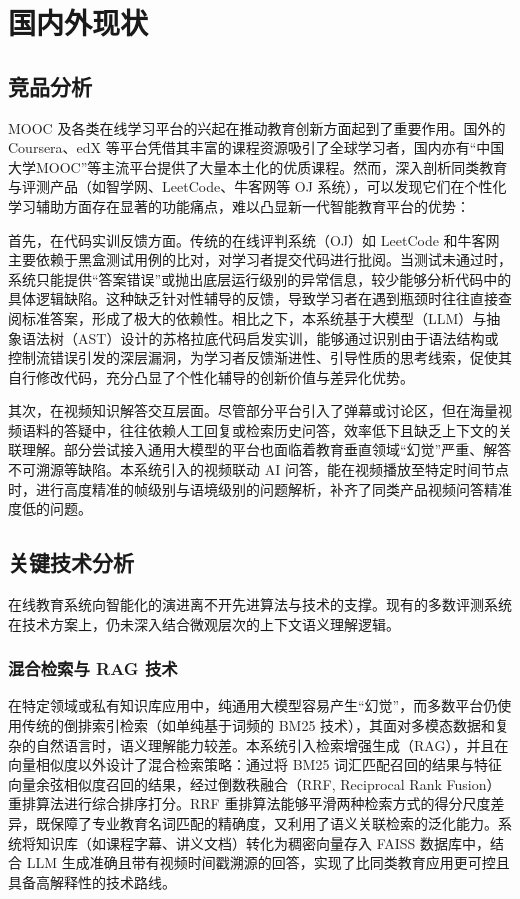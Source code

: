 \chapter{国内外现状}

\section{竞品分析}

MOOC 及各类在线学习平台的兴起在推动教育创新方面起到了重要作用。国外的 Coursera、edX 等平台凭借其丰富的课程资源吸引了全球学习者，国内亦有“中国大学MOOC”等主流平台提供了大量本土化的优质课程。然而，深入剖析同类教育与评测产品（如智学网、LeetCode、牛客网等 OJ 系统），可以发现它们在个性化学习辅助方面存在显著的功能痛点，难以凸显新一代智能教育平台的优势：

首先，在代码实训反馈方面。传统的在线评判系统（OJ）如 LeetCode 和牛客网主要依赖于黑盒测试用例的比对，对学习者提交代码进行批阅。当测试未通过时，系统只能提供“答案错误”或抛出底层运行级别的异常信息，较少能够分析代码中的具体逻辑缺陷。这种缺乏针对性辅导的反馈，导致学习者在遇到瓶颈时往往直接查阅标准答案，形成了极大的依赖性。相比之下，本系统基于大模型（LLM）与抽象语法树（AST）设计的苏格拉底代码启发实训，能够通过识别由于语法结构或控制流错误引发的深层漏洞，为学习者反馈渐进性、引导性质的思考线索，促使其自行修改代码，充分凸显了个性化辅导的创新价值与差异化优势。

其次，在视频知识解答交互层面。尽管部分平台引入了弹幕或讨论区，但在海量视频语料的答疑中，往往依赖人工回复或检索历史问答，效率低下且缺乏上下文的关联理解。部分尝试接入通用大模型的平台也面临着教育垂直领域“幻觉”严重、解答不可溯源等缺陷。本系统引入的视频联动 AI 问答，能在视频播放至特定时间节点时，进行高度精准的帧级别与语境级别的问题解析，补齐了同类产品视频问答精准度低的问题。

\section{关键技术分析}

在线教育系统向智能化的演进离不开先进算法与技术的支撑。现有的多数评测系统在技术方案上，仍未深入结合微观层次的上下文语义理解逻辑。

\subsection{混合检索与 RAG 技术}
在特定领域或私有知识库应用中，纯通用大模型容易产生“幻觉”，而多数平台仍使用传统的倒排索引检索（如单纯基于词频的 BM25 技术\cite{whu-bachelor:14}），其面对多模态数据和复杂的自然语言时，语义理解能力较差。本系统引入检索增强生成（RAG），并且在向量相似度以外设计了混合检索策略：通过将 BM25 词汇匹配召回的结果与特征向量余弦相似度召回的结果，经过倒数秩融合（RRF, Reciprocal Rank Fusion）重排算法进行综合排序打分。RRF 重排算法能够平滑两种检索方式的得分尺度差异，既保障了专业教育名词匹配的精确度，又利用了语义关联检索的泛化能力。系统将知识库（如课程字幕、讲义文档）转化为稠密向量存入 FAISS 数据库中，结合 LLM 生成准确且带有视频时间戳溯源的回答，实现了比同类教育应用更可控且具备高解释性的技术路线。

